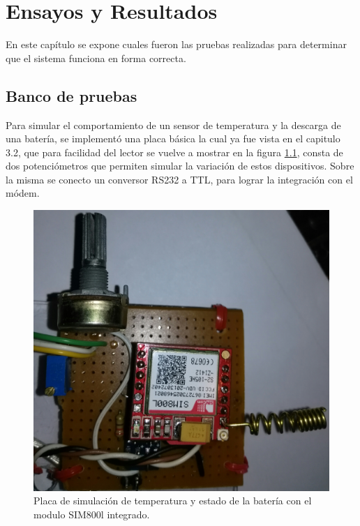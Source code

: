 \chapter{Ensayos y Resultados} %
En este capítulo se expone cuales fueron las pruebas realizadas para determinar que el sistema funciona en forma correcta.
\label{Chapter4} %

\section{Banco de pruebas}
Para simular el comportamiento de un sensor de temperatura y la descarga de una batería, se implementó una placa básica la cual ya fue vista en el capitulo 3.2, que para facilidad del lector se vuelve a mostrar en la figura \ref{fig:placa_básica}, consta de dos potenciómetros que permiten simular la variación de estos dispositivos. Sobre la misma se conecto un conversor RS232 a TTL, para lograr la integración con el módem.

\begin{figure}[h]
  \centering
  \includegraphics[scale=.1]{./Figures/placa_basica.jpg}
  \caption{Placa de simulación de temperatura y estado de la batería con el modulo SIM800l integrado.}
  \label{fig:placa_básica}
\end{figure}

